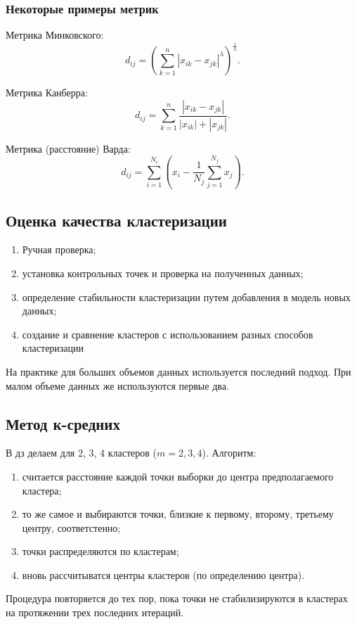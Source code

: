 \documentclass[12pt]{article}
\begin{document}
\subsubsection{Некоторые примеры метрик}
Метрика Минковского:
\[ d_{ij} = \left( \sum_{k=1}^n | x_{ik} - x_{jk} |^{\lambda} \right)^{\frac{1}{\lambda}}. \]

Метрика Канберра:
\[ d_{ij} = \sum_{k=1}^n\frac{|x_{ik} - x_{jk}|}{|x_{ik}| + |x_{jk}|}.\]

Метрика (расстояние) Варда:
\[ d_{ij} = \sum_{i=1}^{N_i} \left( x_i - \frac{1}{N_j} \sum_{j=1}^{N_j} x_j \right).\]

\subsection{Оценка качества кластеризации}
\begin{enumerate}
    \item Ручная проверка;
    \item установка контрольных точек и проверка на полученных данных;
    \item определение стабильности кластеризации путем добавления в модель новых данных;
    \item создание и сравнение кластеров с использованием разных способов кластеризации  
\end{enumerate}

На практике для больших объемов данных используется последний подход. При малом объеме данных же используются первые два.

\subsection{Метод к-средних}
В дз делаем для 2, 3, 4 кластеров ($m = 2, 3, 4$). Алгоритм:
\begin{enumerate}
    \item считается расстояние каждой точки выборки до центра предполагаемого кластера;
    \item то же самое и выбираются точки, близкие к первому, второму, третьему центру, соответстенно;
    \item точки распределяются по кластерам;
    \item вновь рассчитыватся центры кластеров (по определению центра).
\end{enumerate}
Процедура повторяется до тех пор, пока точки не стабилизируются в кластерах на протяжении трех последних итераций.\\
\end{document}
